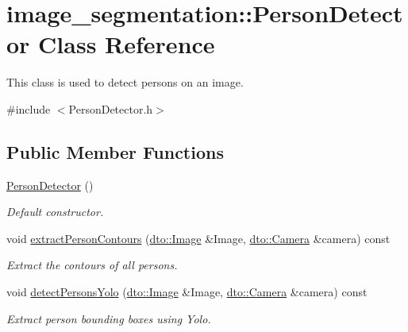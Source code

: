 \hypertarget{classimage__segmentation_1_1_person_detector}{}\section{image\+\_\+segmentation\+:\+:Person\+Detector Class Reference}
\label{classimage__segmentation_1_1_person_detector}


This class is used to detect persons on an image.  




{\ttfamily \#include $<$Person\+Detector.\+h$>$}

\subsection*{Public Member Functions}
\begin{DoxyCompactItemize}
\item 
\mbox{\label{classimage__segmentation_1_1_person_detector_a3c8cb1693b37cc4f4befd41089eab6ab}} 
\mbox{\hyperlink{classimage__segmentation_1_1_person_detector_a3c8cb1693b37cc4f4befd41089eab6ab}{Person\+Detector}} ()
\begin{DoxyCompactList}\small\item\em Default constructor. \end{DoxyCompactList}\item 
\mbox{\label{classimage__segmentation_1_1_person_detector_ac0d7c66d7a4963d539b2f35f20ba84ad}} 
void \mbox{\hyperlink{classimage__segmentation_1_1_person_detector_ac0d7c66d7a4963d539b2f35f20ba84ad}{extract\+Person\+Contours}} (\mbox{\hyperlink{structdto_1_1_image}{dto\+::\+Image}} \&Image, \mbox{\hyperlink{structdto_1_1_camera}{dto\+::\+Camera}} \&camera) const
\begin{DoxyCompactList}\small\item\em Extract the contours of all persons. \end{DoxyCompactList}\item 
\mbox{\label{classimage__segmentation_1_1_person_detector_a73c1be3e410999f51fc3be592f6bb74d}} 
void \mbox{\hyperlink{classimage__segmentation_1_1_person_detector_a73c1be3e410999f51fc3be592f6bb74d}{detect\+Persons\+Yolo}} (\mbox{\hyperlink{structdto_1_1_image}{dto\+::\+Image}} \&Image, \mbox{\hyperlink{structdto_1_1_camera}{dto\+::\+Camera}} \&camera) const
\begin{DoxyCompactList}\small\item\em Extract person bounding boxes using Yolo. \end{DoxyCompactList}\end{DoxyCompactItemize}


